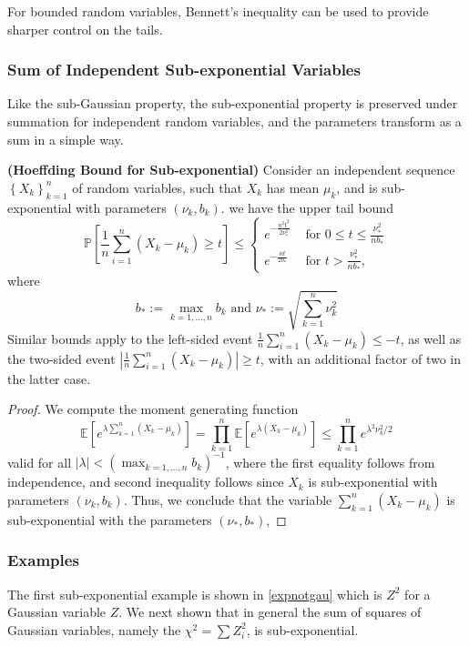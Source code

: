 \documentclass{article}
\newcommand{\bfs}[1]{\textbf{({#1})}}
\begin{document}
 For bounded random variables, Bennett’s inequality can be used to provide sharper control on the tails.

\subsubsection{Sum of Independent Sub-exponential Variables}
Like the sub-Gaussian property, the sub-exponential property is preserved under summation for independent random variables, and the parameters transform as a sum in a simple way. 
\begin{thma}{\bfs{Hoeffding Bound for  Sub-exponential}}\label{thmhoeexp}
Consider an independent sequence $\left\{X_{k}\right\}_{k=1}^{n}$ of random variables, such that $X_{k}$ has mean $\mu_{k}$, and is sub-exponential with parameters $\left(\nu_{k}, b_{k}\right) .$ we have  the upper tail bound
$$
\mathbb{P}\left[\frac{1}{n} \sum_{i=1}^{n}\left(X_{k}-\mu_{k}\right) \geq t\right] \leq\left\{\begin{array}{ll}
e^{-\frac{n^2t^{2}}{2\nu_{*}^{2}}} & \text { for } 0 \leq t \leq \frac{\nu_{*}^{2}}{n b_{*}} \\
e^{-\frac{n t}{2 b_{*}}} & \text { for } t>\frac{\nu_{*}^{2}}{n b_{*}},
\end{array}\right.
$$
where
$$
b_{*}:=\max _{k=1, \ldots, n} b_{k} \text { and } \nu_{*}:=\sqrt{\sum_{k=1}^{n} \nu_{k}^{2}}
$$
Similar bounds apply to the left-sided event $\frac{1}{n} \sum_{i=1}^{n}\left(X_{k}-\mu_{k}\right) \leq -t$, as well as the two-sided event $|\frac{1}{n} \sum_{i=1}^{n}\left(X_{k}-\mu_{k}\right) |\geq t$, with an additional factor of two in the latter case.
\end{thma}
\begin{proof}
 We compute the moment generating function
$$
\mathbb{E}\left[e^{\lambda \sum_{k=1}^{n}\left(X_{k}-\mu_{k}\right)}\right] = \prod_{k=1}^{n} \mathbb{E}\left[e^{\lambda\left(X_{k}-\mu_{k}\right)}\right] \leq \prod_{k=1}^{n} e^{\lambda^{2} \nu_{k}^{2} / 2}
$$
valid for all $|\lambda|<\left(\max _{k=1, \ldots, n} b_{k}\right)^{-1}$, where the first equality follows from independence, and second inequality follows since $X_{k}$ is sub-exponential with parameters $\left(\nu_{k}, b_{k}\right)$. Thus, we conclude that the variable $\sum_{k=1}^{n}\left(X_{k}-\mu_{k}\right)$ is sub-exponential with the parameters $\left(\nu_{*}, b_{*}\right)$, 
\end{proof}


\subsubsection{Examples}
The first sub-exponential example is shown in \cref{expnotgau} which is  $Z^2$ for a Gaussian variable $Z$. We next shown that in general the sum of squares of Gaussian variables, namely the  $\chi^2=\sum Z_i^2$, is sub-exponential.
\end{document}
